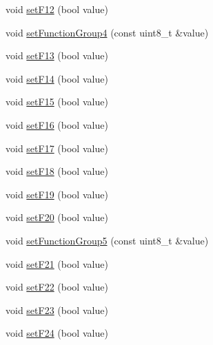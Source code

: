 \begin{DoxyCompactItemize}
\item 
void \hyperlink{classTBT_1_1LocDecoder_a8b7c59df79fb92011db6e5e5999ffd28_a8b7c59df79fb92011db6e5e5999ffd28}{set\+F12} (bool value)
\item 
void \hyperlink{classTBT_1_1LocDecoder_a5b7c569ddccfe68faef7136bf27fadb8_a5b7c569ddccfe68faef7136bf27fadb8}{set\+Function\+Group4} (const uint8\+\_\+t \&value)
\item 
void \hyperlink{classTBT_1_1LocDecoder_a90966aa043e13a5f2a8c4f4019c662c9_a90966aa043e13a5f2a8c4f4019c662c9}{set\+F13} (bool value)
\item 
void \hyperlink{classTBT_1_1LocDecoder_a4d74e6b1232f3c716bf624dc1681164a_a4d74e6b1232f3c716bf624dc1681164a}{set\+F14} (bool value)
\item 
void \hyperlink{classTBT_1_1LocDecoder_aee5779bd1917c16099c77b3d57aedbb8_aee5779bd1917c16099c77b3d57aedbb8}{set\+F15} (bool value)
\item 
void \hyperlink{classTBT_1_1LocDecoder_a0a1a0f36dbe6b3c0c50eda41eb7b673e_a0a1a0f36dbe6b3c0c50eda41eb7b673e}{set\+F16} (bool value)
\item 
void \hyperlink{classTBT_1_1LocDecoder_ad1355610f7158630e75af3df1e4d01c4_ad1355610f7158630e75af3df1e4d01c4}{set\+F17} (bool value)
\item 
void \hyperlink{classTBT_1_1LocDecoder_aae4349cafcf17f8530ce151507bf3cf3_aae4349cafcf17f8530ce151507bf3cf3}{set\+F18} (bool value)
\item 
void \hyperlink{classTBT_1_1LocDecoder_a4625176dfddd8495f7a11be4b9dd29bf_a4625176dfddd8495f7a11be4b9dd29bf}{set\+F19} (bool value)
\item 
void \hyperlink{classTBT_1_1LocDecoder_a04a0514ad5b63714ca5774cf3c2e277c_a04a0514ad5b63714ca5774cf3c2e277c}{set\+F20} (bool value)
\item 
void \hyperlink{classTBT_1_1LocDecoder_a30659350a469bda322d276ee17b1b89c_a30659350a469bda322d276ee17b1b89c}{set\+Function\+Group5} (const uint8\+\_\+t \&value)
\item 
void \hyperlink{classTBT_1_1LocDecoder_ab5d79049ab7e38b4d408c9627db99a6d_ab5d79049ab7e38b4d408c9627db99a6d}{set\+F21} (bool value)
\item 
void \hyperlink{classTBT_1_1LocDecoder_a7dc0125781c063f15dda51d03ec3e25d_a7dc0125781c063f15dda51d03ec3e25d}{set\+F22} (bool value)
\item 
void \hyperlink{classTBT_1_1LocDecoder_a7b5a668ba542b1d8a8b47064be1f5c5a_a7b5a668ba542b1d8a8b47064be1f5c5a}{set\+F23} (bool value)
\item 
void \hyperlink{classTBT_1_1LocDecoder_a3c44b57443b1d600380ccf8e55da23e5_a3c44b57443b1d600380ccf8e55da23e5}{set\+F24} (bool value)

\end{DoxyCompactItemize}
